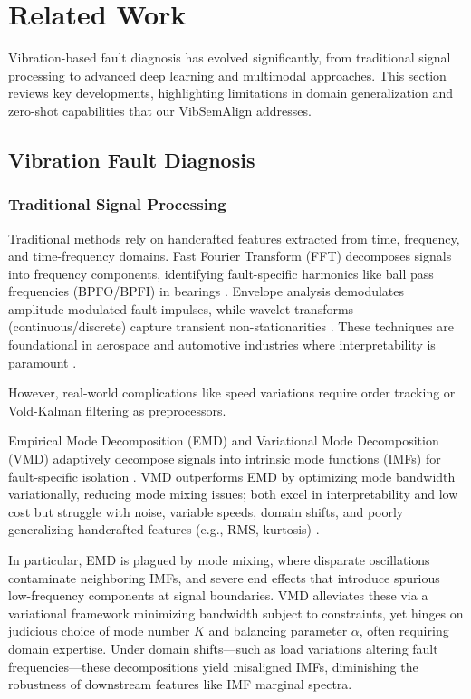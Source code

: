 \section{Related Work}

Vibration-based fault diagnosis has evolved significantly, from traditional signal processing to advanced deep learning and multimodal approaches. This section reviews key developments, highlighting limitations in domain generalization and zero-shot capabilities that our VibSemAlign addresses.

\subsection{Vibration Fault Diagnosis}
\subsubsection{Traditional Signal Processing}
Traditional methods rely on handcrafted features extracted from time, frequency, and time-frequency domains. Fast Fourier Transform (FFT) decomposes signals into frequency components, identifying fault-specific harmonics like ball pass frequencies (BPFO/BPFI) in bearings \cite{randall2011vibration}. Envelope analysis demodulates amplitude-modulated fault impulses, while wavelet transforms (continuous/discrete) capture transient non-stationarities \cite{lei2018review}. These techniques are foundational in aerospace and automotive industries where interpretability is paramount \cite{randall2011vibration}.

However, real-world complications like speed variations require order tracking or Vold-Kalman filtering as preprocessors.

Empirical Mode Decomposition (EMD) and Variational Mode Decomposition (VMD) adaptively decompose signals into intrinsic mode functions (IMFs) for fault-specific isolation \cite{dragomiretskiy2014emd}. VMD outperforms EMD by optimizing mode bandwidth variationally, reducing mode mixing issues; both excel in interpretability and low cost but struggle with noise, variable speeds, domain shifts, and poorly generalizing handcrafted features (e.g., RMS, kurtosis) \cite{wen2020domain}.

In particular, EMD is plagued by mode mixing, where disparate oscillations contaminate neighboring IMFs, and severe end effects that introduce spurious low-frequency components at signal boundaries. VMD alleviates these via a variational framework minimizing bandwidth subject to constraints, yet hinges on judicious choice of mode number $K$ and balancing parameter $\alpha$, often requiring domain expertise. Under domain shifts---such as load variations altering fault frequencies---these decompositions yield misaligned IMFs, diminishing the robustness of downstream features like IMF marginal spectra.

